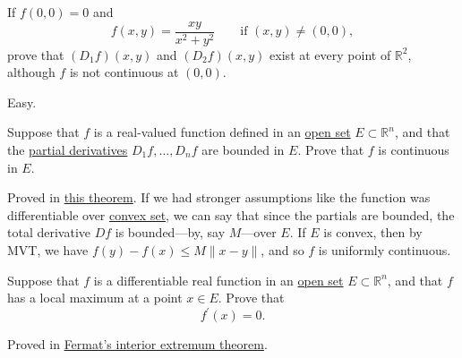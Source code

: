 	\begin{exercise}[Rudin 9.6]
		If $f(0,0)=0$ and
		\begin{equation}
			f(x,y)=\frac{xy}{x^2+y^2}
			\qquad \text{if } (x,y)\neq(0,0),
		\end{equation}
		prove that $(D_1f)(x,y)$ and $(D_2f)(x,y)$ exist at every point of $\mathbb{R}^2$, although $f$ is not continuous at $(0,0)$.
	\end{exercise}
	\begin{solution}
	  Easy. 
	\end{solution}

	\begin{exercise}[Rudin 9.7]
		Suppose that $f$ is a real-valued function defined in an \hyperref[pst-def:open-set]{open set} $E\subset\mathbb{R}^n$, and that the \hyperref[def:partial-derivative]{partial derivatives} $D_1f,\ldots,D_nf$ are bounded in $E$. Prove that $f$ is continuous in $E$.
	\end{exercise}
	\begin{solution}
		Proved in \hyperref[thm:bounded_partials_continuous]{this theorem}. If we had stronger assumptions like the function was differentiable over \hyperref[alg-def:convex-set]{convex set}, we can say that since the partials are bounded, the total derivative $Df$ is bounded---by, say $M$---over $E$. If $E$ is convex, then by MVT, we have $f(y) - f(x) \leq M \|x - y\|$, and so $f$ is uniformly continuous. 
	\end{solution}

	\begin{exercise}[Rudin 9.8]
		Suppose that $f$ is a differentiable real function in an \hyperref[pst-def:open-set]{open set} $E\subset\mathbb{R}^n$, and that $f$ has a local maximum at a point $x\in E$. Prove that
		\begin{equation}
			f^\prime(x)=0.
		\end{equation}
	\end{exercise}
	\begin{solution}
		Proved in \hyperref[thm:fermat_interior_extremum]{Fermat's interior extremum theorem}. 
	\end{solution}

